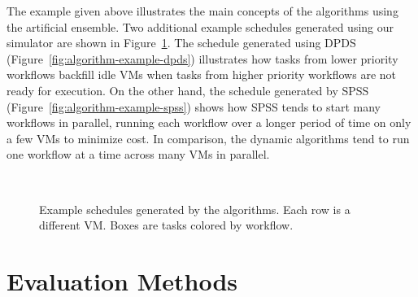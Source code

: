 \documentclass[preprint,5p]{elsarticle}
\begin{document}
The example given above illustrates the main concepts of the algorithms using the artificial ensemble.
Two additional example schedules generated using our simulator are shown in 
Figure~\ref{fig:examples-simulated}. 
The schedule generated using DPDS (Figure~\ref{fig:algorithm-example-dpds})
illustrates how tasks from lower priority workflows backfill idle VMs when
tasks from higher priority workflows are not ready for execution.
On the other hand, the schedule generated by SPSS (Figure~\ref{fig:algorithm-example-spss})
shows how SPSS tends to start many workflows in parallel, running each workflow
over a longer period of time on only a few VMs to minimize cost. In comparison,
the dynamic algorithms tend to run one workflow at a time across many VMs in
parallel.

\begin{figure}[tb] 
  \centering
  \\
  \caption[Example schedules generated by the algorithms]{Example
  schedules generated by the algorithms. Each row is a different
  VM. Boxes are tasks colored by workflow.}
  \label{fig:examples-simulated}

\end{figure}




\section{Evaluation Methods}
\label{sec:performance}
\end{document}
